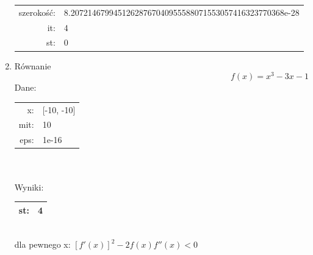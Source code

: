 \documentclass[11pt]{article}
\begin{document}
\begin{enumerate}
\begin{tabular}{r l}
            szerokość:&8.20721467994512628767040955588071553057416323770368e-28\\
            it:&4\\
            st:&0\\
            \hline
        \end{tabular}
        \item Równanie
        $$f(x) = x^3 - 3x -1$$
        Dane:\\
        \begin{tabular}{r l}
            \hline
            x:&[-10, -10]\\
            mit:&10\\
            eps:&1e-16\\
            \hline
        \end{tabular}\\\\
        Wyniki:\\
        \begin{tabular}{r l}
            \hline
            st:&4\\
            \hline
        \end{tabular}\\
        dla pewnego x: $[f'(x)]^2 -2f(x)f''(x) < 0$
    \end{enumerate}
\pagebreak
\tableofcontents
\end{document}
